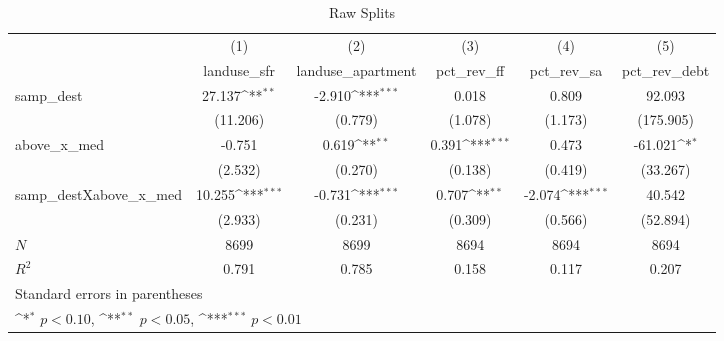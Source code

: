 \begin{table}[htbp]\centering
\def\sym#1{\ifmmode^{#1}\else\(^{#1}\)\fi}
\caption{Raw Splits}
\begin{tabular}{l*{5}{c}}
\hline\hline
            &\multicolumn{1}{c}{(1)}&\multicolumn{1}{c}{(2)}&\multicolumn{1}{c}{(3)}&\multicolumn{1}{c}{(4)}&\multicolumn{1}{c}{(5)}\\
            &\multicolumn{1}{c}{landuse\_sfr}&\multicolumn{1}{c}{landuse\_apartment}&\multicolumn{1}{c}{pct\_rev\_ff}&\multicolumn{1}{c}{pct\_rev\_sa}&\multicolumn{1}{c}{pct\_rev\_debt}\\
\hline
samp\_dest   &      27.137\sym{**} &      -2.910\sym{***}&       0.018         &       0.809         &      92.093         \\
            &    (11.206)         &     (0.779)         &     (1.078)         &     (1.173)         &   (175.905)         \\
[1em]
above\_x\_med &      -0.751         &       0.619\sym{**} &       0.391\sym{***}&       0.473         &     -61.021\sym{*}  \\
            &     (2.532)         &     (0.270)         &     (0.138)         &     (0.419)         &    (33.267)         \\
[1em]
samp\_destXabove\_x\_med&      10.255\sym{***}&      -0.731\sym{***}&       0.707\sym{**} &      -2.074\sym{***}&      40.542         \\
            &     (2.933)         &     (0.231)         &     (0.309)         &     (0.566)         &    (52.894)         \\
\hline
\(N\)       &        8699         &        8699         &        8694         &        8694         &        8694         \\
\(R^{2}\)   &       0.791         &       0.785         &       0.158         &       0.117         &       0.207         \\
\hline\hline
\multicolumn{6}{l}{\footnotesize Standard errors in parentheses}\\
\multicolumn{6}{l}{\footnotesize \sym{*} \(p<0.10\), \sym{**} \(p<0.05\), \sym{***} \(p<0.01\)}\\
\end{tabular}
\end{table}
